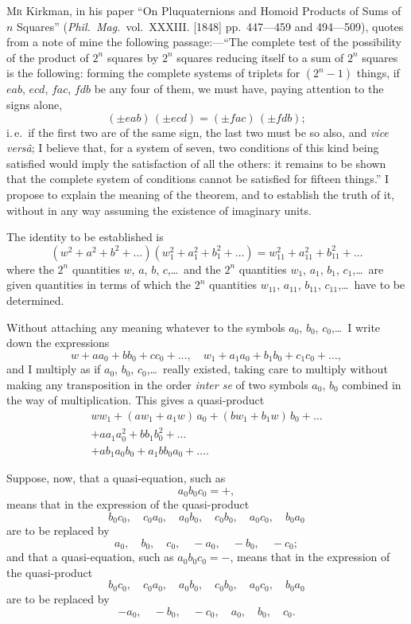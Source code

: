 \documentclass[11pt]{article}
\begin{document}
\textsc{Mr} Kirkman, in his paper ``On Pluquaternions and Homoid Products of Sums of $n$ Squares'' (\textit{Phil.\ Mag.}\ vol.~XXXIII. [1848] pp.~447---459 and 494---509), quotes from a note of mine the following passage:---``The complete test of the possibility of the product of $2^n$ squares by $2^n$ squares reducing itself to a sum of $2^n$ squares is the following: forming the complete systems of triplets for $(2^n-1)$ things, if $eab$, $ecd$, $fac$, $fdb$ be any four of them, we must have, paying attention to the signs alone,
\[
(\pm eab)\,(\pm ecd) = (\pm fac)\,(\pm fdb);
\]
i.\,e.\ if the first two are of the same sign, the last two must be so also, and \textit{vice vers\^a}; I believe that, for a system of seven, two conditions of this kind being satisfied would imply the satisfaction of all the others: it remains to be shown that the complete system of conditions cannot be satisfied for fifteen things.'' I propose to explain the meaning of the theorem, and to establish the truth of it, without in any way assuming the existence of imaginary units.

The identity to be established is
\[
(w^2 + a^2 + b^2 + \ldots)(w_1^2 + a_1^2 + b_1^2 + \ldots) = w_{11}^2 + a_{11}^2 + b_{11}^2 + \ldots
\]
where the $2^n$ quantities $w$, $a$, $b$, $c$,\ldots\ and the $2^n$ quantities $w_1$, $a_1$, $b_1$, $c_1$,\ldots\ are given quantities in terms of which the $2^n$ quantities $w_{11}$, $a_{11}$, $b_{11}$, $c_{11}$,\ldots\ have to be determined.

Without attaching any meaning whatever to the symbols $a_0$, $b_0$, $c_0$,\ldots\ I write down the expressions
\[
w + aa_0 + bb_0 + cc_0 + \ldots, \quad w_1 + a_1a_0 + b_1b_0 + c_1c_0 + \ldots,
\]
and I multiply as if $a_0$, $b_0$, $c_0$,\ldots\ really existed, taking care to multiply without making any transposition in the order \textit{inter se} of two symbols $a_0$, $b_0$ combined in the way of multiplication. This gives a quasi-product
\begin{multline*}
ww_1 + (aw_1+a_1w)\,a_0 + (bw_1+b_1w)\,b_0 + \ldots\\
+ aa_1 a_0^2 + bb_1 b_0^2 + \ldots\\
+ ab_1 a_0 b_0 + a_1 b b_0 a_0 + \ldots.
\end{multline*}

Suppose, now, that a quasi-equation, such as
\[
a_0 b_0 c_0 = +,
\]
means that in the expression of the quasi-product
\[
b_0 c_0, \quad c_0 a_0, \quad a_0 b_0, \quad c_0 b_0, \quad a_0 c_0, \quad b_0 a_0
\]
are to be replaced by
\[
a_0, \quad b_0, \quad c_0, \quad -a_0, \quad -b_0, \quad -c_0;
\]
and that a quasi-equation, such as $a_0 b_0 c_0 = -$, means that in the expression of the quasi-product
\[
b_0 c_0, \quad c_0 a_0, \quad a_0 b_0, \quad c_0 b_0, \quad a_0 c_0, \quad b_0 a_0
\]
are to be replaced by
\[
-a_0, \quad -b_0, \quad -c_0, \quad a_0, \quad b_0, \quad c_0.
\]
\end{document}
